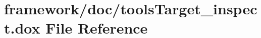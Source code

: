 \hypertarget{tools_target__inspect_8dox}{}\section{framework/doc/tools\+Target\+\_\+inspect.dox File Reference}
\label{tools_target__inspect_8dox}
